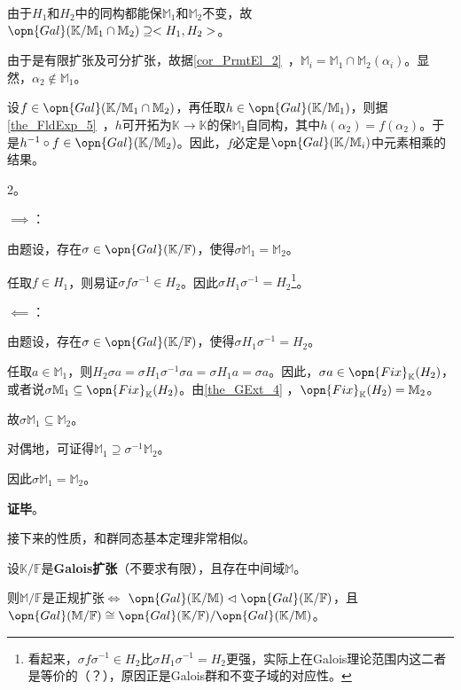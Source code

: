由于$H_1$和$H_2$中的同构都能保$\mathbb{M}_1$和$\mathbb{M}_2$不变，故$\opn{Gal}(\mathbb{K}/\mathbb{M}_1\cap\mathbb{M}_2)\supseteq<H_1, H_2>$。

由于是有限扩张及可分扩张，故据\autoref{cor_PrmtEl_2}~，$\mathbb{M}_i=\mathbb{M}_1\cap\mathbb{M}_2(\alpha_i)$。显然，$\alpha_2\not\in\mathbb{M}_1$。

设$f\in\opn{Gal}(\mathbb{K}/\mathbb{M}_1\cap\mathbb{M}_2)$，再任取$h\in\opn{Gal}(\mathbb{K}/\mathbb{M}_1)$，则据\autoref{the_FldExp_5}~，$h$可开拓为$\mathbb{K}\to\mathbb{K}$的保$\mathbb{M}_1$自同构，其中$h(\alpha_2)=f(\alpha_2)$。于是$h^{-1}\circ f\in\opn{Gal}(\mathbb{K}/\mathbb{M}_2)$。因此，$f$必定是$\opn{Gal}(\mathbb{K}/\mathbb{M}_i)$中元素相乘的结果。

2。

$\implies$：

由题设，存在$\sigma\in\opn{Gal}(\mathbb{K}/\mathbb{F})$，使得$\sigma \mathbb{M}_1=\mathbb{M}_2$。

任取$f\in H_1$，则易证$\sigma f\sigma^{-1}\in H_2$。因此$\sigma H_1\sigma^{-1}=H_2$\footnote{看起来，$\sigma f\sigma^{-1}\in H_2$比$\sigma H_1\sigma^{-1}=H_2$更强，实际上在Galois理论范围内这二者是等价的（？），原因正是Galois群和不变子域的对应性。}。

$\impliedby$：

由题设，存在$\sigma\in\opn{Gal}(\mathbb{K}/\mathbb{F})$，使得$\sigma H_1\sigma^{-1}=H_2$。

任取$a\in\mathbb{M}_{1}$，则$H_2 \sigma a=\sigma H_1\sigma^{-1}\sigma a=\sigma H_1 a=\sigma a$。因此，$\sigma a\in\opn{Fix}_\mathbb{K}(H_2)$，或者说$\sigma\mathbb{M}_1\subseteq\opn{Fix}_\mathbb{K}(H_2)$。由\autoref{the_GExt_4} ，$\opn{Fix}_\mathbb{K}(H_2)=\mathbb{M}_2$。

故$\sigma\mathbb{M}_1\subseteq\mathbb{M}_2$。

对偶地，可证得$\mathbb{M}_1\supseteq\sigma^{-1}\mathbb{M}_2$。

因此$\sigma\mathbb{M}_1=\mathbb{M}_2$。




\textbf{证毕}。




接下来的性质，和群同态基本定理非常相似。

\begin{theorem}{}\label{the_GExt_8}
设$\mathbb{K}/\mathbb{F}$是\textbf{Galois扩张}（不要求有限），且存在中间域$\mathbb{M}$。

则$\mathbb{M}/\mathbb{F}$是正规扩张$\iff$ $\opn{Gal}(\mathbb{K/\mathbb{M}})\vartriangleleft\opn{Gal}(\mathbb{K/\mathbb{F}})$，且$\opn{Gal}(\mathbb{M}/\mathbb{F})\cong \opn{Gal}(\mathbb{K}/\mathbb{F})/\opn{Gal}(\mathbb{K}/\mathbb{M})$。
\end{theorem}

